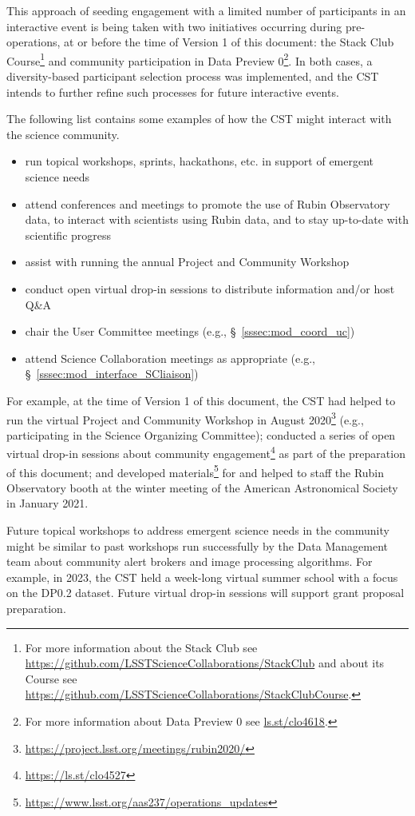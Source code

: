 \documentclass[DM,authoryear,toc]{lsstdoc}
\begin{document}
This approach of seeding engagement with a limited number of participants in an interactive event is being taken with two initiatives occurring during pre-operations, at or before the time of Version 1 of this document: the Stack Club Course\footnote{For more information about the Stack Club see \url{https://github.com/LSSTScienceCollaborations/StackClub} and about its Course see \url{https://github.com/LSSTScienceCollaborations/StackClubCourse}.} and community participation in Data Preview 0\footnote{For more information about Data Preview 0 see \url{ls.st/clo4618}.}.
In both cases, a diversity-based participant selection process was implemented, and the CST intends to further refine such processes for future interactive events. 

The following list contains some examples of how the CST might interact with the science community.
\begin{itemize}
\item run topical workshops, sprints, hackathons, etc. in support of emergent science needs
\item attend conferences and meetings to promote the use of Rubin Observatory data, to interact with scientists using Rubin data, and to stay up-to-date with scientific progress
\item assist with running the annual Project and Community Workshop
\item conduct open virtual drop-in sessions to distribute information and/or host Q\&A 
\item chair the User Committee meetings (e.g., \S~\ref{sssec:mod_coord_uc})
\item attend Science Collaboration meetings as appropriate (e.g., \S~\ref{sssec:mod_interface_SCliaison})
\end{itemize}

For example, at the time of Version 1 of this document, the CST had helped to run the virtual Project and Community Workshop in August 2020\footnote{\url{https://project.lsst.org/meetings/rubin2020/}} (e.g., participating in the Science Organizing Committee); conducted a series of open virtual drop-in sessions about community engagement\footnote{\url{https://ls.st/clo4527}} as part of the preparation of this document; and developed materials\footnote{\url{https://www.lsst.org/aas237/operations_updates}} for and helped to staff the Rubin Observatory booth at the winter meeting of the American Astronomical Society in January 2021. 

Future topical workshops to address emergent science needs in the community might be similar to past workshops run successfully by the Data Management team about community alert brokers and image processing algorithms. 
For example, in 2023, the CST held a week-long virtual summer school with a focus on the DP0.2 dataset. 
Future virtual drop-in sessions will support grant proposal preparation. 
\end{document}
